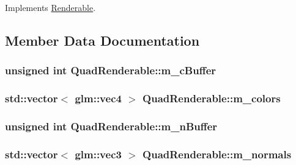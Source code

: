 Implements \hyperlink{classRenderable_a98ab6308c1d2b56dacda7c435fb38d5b}{Renderable}.



\subsection{Member Data Documentation}
\hypertarget{classQuadRenderable_af276accada410c35db3feb1456e6da15}{
\subsubsection[{m\+\_\+c\+Buffer}]{\setlength{\rightskip}{0pt plus 5cm}unsigned int Quad\+Renderable\+::m\+\_\+c\+Buffer\hspace{0.3cm}{\ttfamily [private]}}}\label{classQuadRenderable_af276accada410c35db3feb1456e6da15}
\hypertarget{classQuadRenderable_a775824ad790972ac1fb82553ce2d9268}{
\subsubsection[{m\+\_\+colors}]{\setlength{\rightskip}{0pt plus 5cm}std\+::vector$<$ glm\+::vec4 $>$ Quad\+Renderable\+::m\+\_\+colors\hspace{0.3cm}{\ttfamily [private]}}}\label{classQuadRenderable_a775824ad790972ac1fb82553ce2d9268}
\hypertarget{classQuadRenderable_aa812c4e6491db1ac7e464f5b3dc8561a}{
\subsubsection[{m\+\_\+n\+Buffer}]{\setlength{\rightskip}{0pt plus 5cm}unsigned int Quad\+Renderable\+::m\+\_\+n\+Buffer\hspace{0.3cm}{\ttfamily [private]}}}\label{classQuadRenderable_aa812c4e6491db1ac7e464f5b3dc8561a}
\hypertarget{classQuadRenderable_a6af0484f27f593537f05c7eb8386bd09}{
\subsubsection[{m\+\_\+normals}]{\setlength{\rightskip}{0pt plus 5cm}std\+::vector$<$ glm\+::vec3 $>$ Quad\+Renderable\+::m\+\_\+normals\hspace{0.3cm}{\ttfamily [private]}}}\label{classQuadRenderable_a6af0484f27f593537f05c7eb8386bd09}
